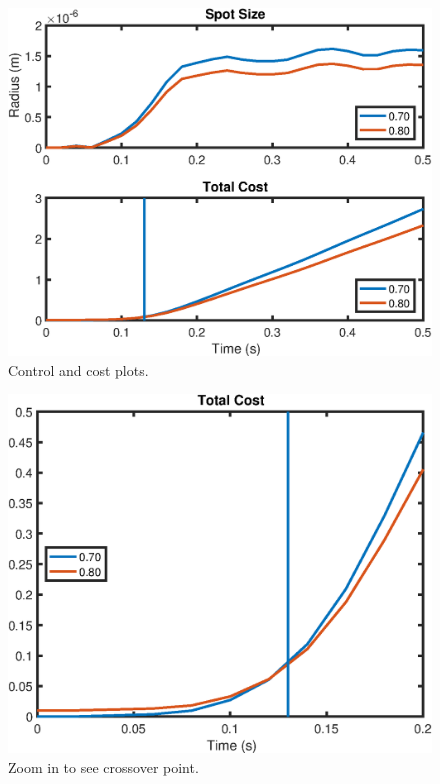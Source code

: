\documentclass{aiaa-tc}
\begin{document}
\begin{figure}[t]	%
 \centering
 \includegraphics[height=0.5\textwidth]{Figures/costPlots}
 \caption{Control and cost plots.}
 \label{costPlots}
\end{figure}

\begin{figure}[b]	%
 \centering
 \includegraphics[height=0.5\textwidth]{Figures/zoomCostPlot}
 \caption{Zoom in to see crossover point.}
 \label{zoomCost}
\end{figure}
\end{document}
